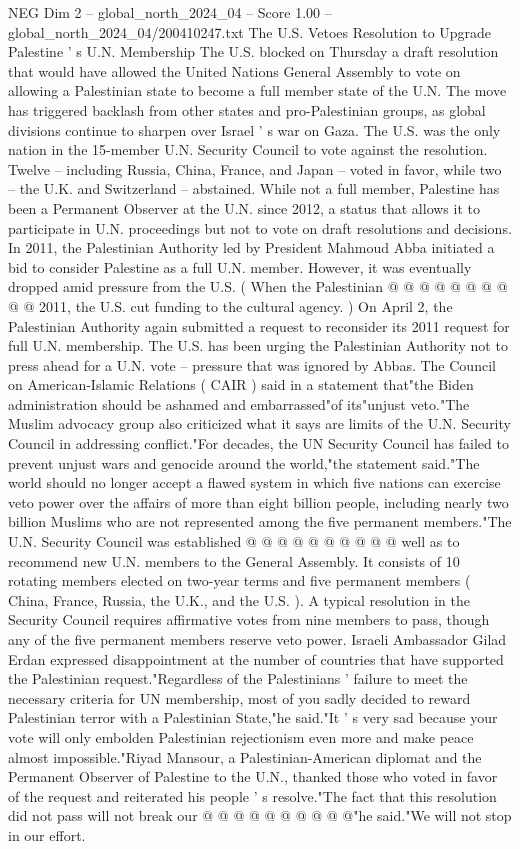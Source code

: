 \begin{textsample}{NEG Dim 2 – global\_north\_2024\_04 – Score 1.00 – global\_north\_2024\_04/200410247.txt}  \label{ex:f2_neg_182}
The U.S.
Vetoes Resolution to Upgrade Palestine ' s U.N.
Membership The U.S. blocked on Thursday a draft resolution that would have allowed the United Nations General Assembly to vote on allowing a Palestinian state to become a full member state of the U.N.
The move has triggered backlash from other states and pro-Palestinian groups, as global divisions continue to sharpen over Israel ' s war on Gaza.
The U.S. was the only nation in the 15-member U.N.
Security Council to vote against the resolution.
Twelve -- including Russia, China, France, and Japan -- voted in favor, while two -- the U.K. and Switzerland -- abstained.
While not a full member, Palestine has been a Permanent Observer at the U.N. since 2012, a status that allows it to participate in U.N. proceedings but not to vote on draft resolutions and decisions.
In 2011, the Palestinian Authority led by President Mahmoud Abba initiated a bid to consider Palestine as a full U.N. member.
However, it was eventually dropped amid pressure from the U.S. ( When the Palestinian @ @ @ @ @ @ @ @ @ @ 2011, the U.S. cut funding to the cultural agency. ) On April 2, the Palestinian Authority again submitted a request to reconsider its 2011 request for full U.N. membership.
The U.S. has been urging the Palestinian Authority not to press ahead for a U.N. vote -- pressure that was ignored by Abbas.
The Council on American-Islamic Relations ( CAIR ) said in a statement that"the Biden administration should be ashamed and embarrassed"of its"unjust veto."The Muslim advocacy group also criticized what it says are limits of the U.N.
Security Council in addressing conflict."For decades, the UN Security Council has failed to prevent unjust wars and genocide around the world,"the statement said."The world should no longer accept a flawed system in which five nations can exercise veto power over the affairs of more than eight billion people, including nearly two billion Muslims who are not represented among the five permanent members."The U.N.
Security Council was established @ @ @ @ @ @ @ @ @ @ well as to recommend new U.N. members to the General Assembly.
It consists of 10 rotating members elected on two-year terms and five permanent members ( China, France, Russia, the U.K., and the U.S. ).
A typical resolution in the Security Council requires affirmative votes from nine members to pass, though any of the five permanent members reserve veto power.
Israeli Ambassador Gilad Erdan expressed disappointment at the number of countries that have supported the Palestinian request."Regardless of the Palestinians ' failure to meet the necessary criteria for UN membership, most of you sadly decided to reward Palestinian terror with a Palestinian State,"he said."It ' s very sad because your vote will only embolden Palestinian rejectionism even more and make peace almost impossible."Riyad Mansour, a Palestinian-American diplomat and the Permanent Observer of Palestine to the U.N., thanked those who voted in favor of the request and reiterated his people ' s resolve."The fact that this resolution did not pass will not break our @ @ @ @ @ @ @ @ @ @"he said."We will not stop in our effort.

\end{textsample}
